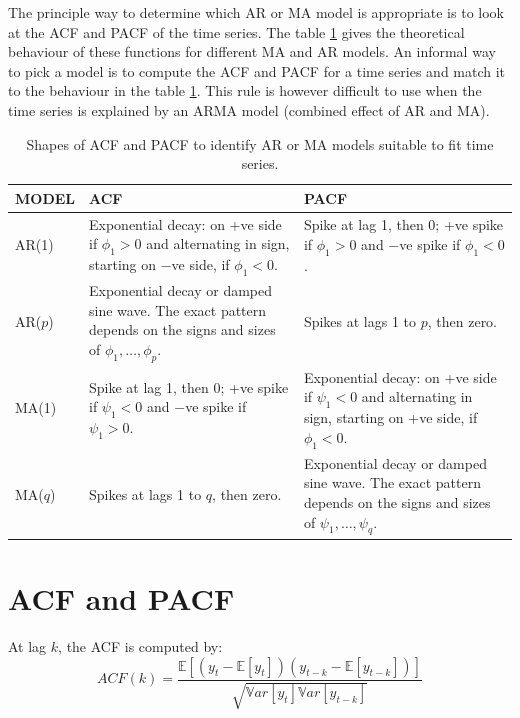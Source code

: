 \documentclass[a4paper,11pt,oneside,onecolumn]{book}
\begin{document}
The principle way to
determine which AR or MA model is appropriate is to look at the ACF
and PACF of the time series. The table \ref{tab:ACF:PACF:AR:MA} gives the theoretical
behaviour of these functions for different MA and AR models. An
informal way to pick a model is to compute the ACF and PACF for a
time series and match it to the behaviour in the table \ref{tab:ACF:PACF:AR:MA}.
This rule is however difficult to use when the time series is explained by an ARMA model (combined effect of AR and MA).



\vspace{.2cm}

\begin{table}[!h]
\begin{center}
\begin{tabular}{lp{6.5cm}p{6.5cm}} \hline
{\bf MODEL} & {\bf ACF} & {\bf PACF} \\[.2cm] \hline
AR(1) & Exponential decay: on +ve side if $\phi_1>0$ and alternating
in sign, starting on $-$ve side, if $\phi_1<0$. & Spike at lag 1,
then 0; +ve
spike if $\phi_1>0$ and $-$ve spike if $\phi_1<0$. \\
AR($p$) & Exponential decay or damped sine wave. The exact pattern
depends on the signs and sizes of $\phi_1,\ldots,\phi_p$. & Spikes
at lags 1 to $p$, then zero. \\
MA(1) & Spike at lag 1, then 0; +ve spike if $\psi_1<0$ and $-$ve
spike if $\psi_1>0$. & Exponential decay: on +ve side if $\psi_1<0$
and alternating in sign, starting on +ve side, if
$\phi_1<0$. \\
MA($q$) & Spikes at lags 1 to $q$, then zero. & Exponential decay or
damped sine wave. The exact pattern depends on the signs and sizes
of $\psi_1,\ldots,\psi_q$. \\ \hline
\end{tabular}
\end{center}
\caption{Shapes of ACF and PACF to identify AR or MA models suitable to fit time series.}\label{tab:ACF:PACF:AR:MA}
\end{table}


\section{ACF and PACF}

\begin{definition}[ACF]
At lag $k$, the ACF is computed by:
$$
ACF(k)=\frac{\mathbb{E}\left\lbrack \left(y_t-\mathbb{E}[y_t]\right) \left(y_{t-k}-\mathbb{E}[y_{t-k}]\right) \right\rbrack}{\sqrt{\mathbb{V}ar[y_t]\mathbb{V}ar[y_{t-k}]}}
$$
\end{definition}
\end{document}
